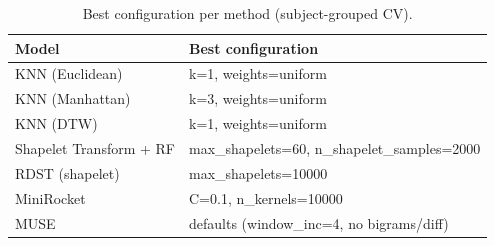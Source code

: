 \begin{table}[H]
\centering
\small
\caption{Best configuration per method (subject-grouped CV).}
\label{tab:ts_params}
\begin{tabular}{l l}
\hline
Model & Best configuration \\
\hline
KNN (Euclidean) & k=1, weights=uniform \\
KNN (Manhattan) & k=3, weights=uniform \\
KNN (DTW) & k=1, weights=uniform \\
Shapelet Transform + RF & max\_shapelets=60, n\_shapelet\_samples=2000 \\
RDST (shapelet) & max\_shapelets=10000 \\
MiniRocket & C=0.1, n\_kernels=10000 \\
MUSE & defaults (window\_inc=4, no bigrams/diff) \\
\hline
\end{tabular}
\end{table}